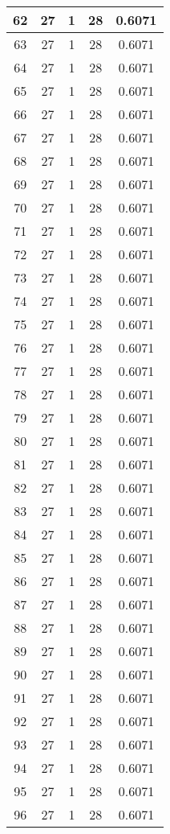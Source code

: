\documentclass[letterpaper, 12pt]{article}
\begin{document}
\begin{longtable}{|c|c|c|c|c|}
\hline
62 & 27 & 1 & 28 & 0.6071 \\
\hline
63 & 27 & 1 & 28 & 0.6071 \\
\hline
64 & 27 & 1 & 28 & 0.6071 \\
\hline
65 & 27 & 1 & 28 & 0.6071 \\
\hline
66 & 27 & 1 & 28 & 0.6071 \\
\hline
67 & 27 & 1 & 28 & 0.6071 \\
\hline
68 & 27 & 1 & 28 & 0.6071 \\
\hline
69 & 27 & 1 & 28 & 0.6071 \\
\hline
70 & 27 & 1 & 28 & 0.6071 \\
\hline
71 & 27 & 1 & 28 & 0.6071 \\
\hline
72 & 27 & 1 & 28 & 0.6071 \\
\hline
73 & 27 & 1 & 28 & 0.6071 \\
\hline
74 & 27 & 1 & 28 & 0.6071 \\
\hline
75 & 27 & 1 & 28 & 0.6071 \\
\hline
76 & 27 & 1 & 28 & 0.6071 \\
\hline
77 & 27 & 1 & 28 & 0.6071 \\
\hline
78 & 27 & 1 & 28 & 0.6071 \\
\hline
79 & 27 & 1 & 28 & 0.6071 \\
\hline
80 & 27 & 1 & 28 & 0.6071 \\
\hline
81 & 27 & 1 & 28 & 0.6071 \\
\hline
82 & 27 & 1 & 28 & 0.6071 \\
\hline
83 & 27 & 1 & 28 & 0.6071 \\
\hline
84 & 27 & 1 & 28 & 0.6071 \\
\hline
85 & 27 & 1 & 28 & 0.6071 \\
\hline
86 & 27 & 1 & 28 & 0.6071 \\
\hline
87 & 27 & 1 & 28 & 0.6071 \\
\hline
88 & 27 & 1 & 28 & 0.6071 \\
\hline
89 & 27 & 1 & 28 & 0.6071 \\
\hline
90 & 27 & 1 & 28 & 0.6071 \\
\hline
91 & 27 & 1 & 28 & 0.6071 \\
\hline
92 & 27 & 1 & 28 & 0.6071 \\
\hline
93 & 27 & 1 & 28 & 0.6071 \\
\hline
94 & 27 & 1 & 28 & 0.6071 \\
\hline
95 & 27 & 1 & 28 & 0.6071 \\
\hline
96 & 27 & 1 & 28 & 0.6071 \\

\end{longtable}
\end{document}
